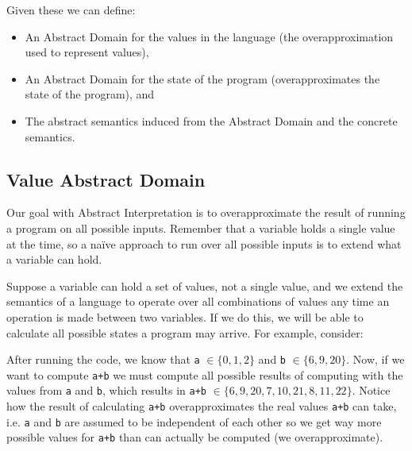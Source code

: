 Given these we can define:

\begin{itemize}
\tightlist
\item
  An Abstract Domain for the values in the language (the
  overapproximation used to represent values),
\item
  An Abstract Domain for the state of the program (overapproximates the
  state of the program), and
\item
  The abstract semantics induced from the Abstract Domain and the
  concrete semantics.
\end{itemize}

\subsection{Value Abstract Domain}\label{value-abstract-domain}

Our goal with Abstract Interpretation is to overapproximate the result
of running a program on all possible inputs. Remember that a variable
holds a single value at the time, so a naïve approach to run over all
possible inputs is to extend what a variable can hold.

Suppose a variable can hold a set of values, not a single value, and we
extend the semantics of a language to operate over all combinations of
values any time an operation is made between two variables. If we do
this, we will be able to calculate all possible states a program may
arrive. For example, consider:

\begin{Shaded}
\begin{Highlighting}[]
\OperatorTok{=} \NormalTok{(}\NormalTok{())  }
\OperatorTok{=} \NormalTok{(}\NormalTok{())}

\OperatorTok{=} 
\OperatorTok{=} 
\OperatorTok{=} 
\OperatorTok{=} 
\NormalTok{:}
\OperatorTok{=} 
\OperatorTok{=} 
\end{Highlighting}
\end{Shaded}

After running the code, we know that \texttt{a} \(\in \{0, 1, 2\}\) and
\texttt{b} \(\in \{6, 9, 20\}\). Now, if we want to compute \texttt{a+b}
we must compute all possible results of computing with the values from
\texttt{a} and \texttt{b}, which results in \texttt{a+b}
\(\in \{6, 9, 20, 7, 10, 21, 8, 11, 22\}\). Notice how the result of
calculating \texttt{a+b} overapproximates the real values \texttt{a+b}
can take, i.e. \texttt{a} and \texttt{b} are assumed to be independent
of each other so we get way more possible values for \texttt{a+b} than
can actually be computed (we overapproximate).

